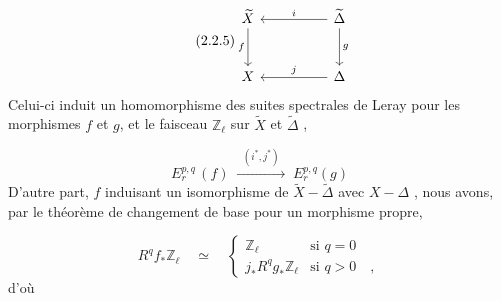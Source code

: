 \begin{equation}\tag{2.2.5}
\begin{tikzcd}[column sep=huge, row sep=large]
\widetilde{X} \arrow[d, "f"'] & \widetilde{\Delta} \arrow[l, "i"'] \arrow[d, "g"] \\
X & \Delta \arrow[l, "j"']
\end{tikzcd}
\end{equation}
Celui-ci induit un homomorphisme des suites spectrales de Leray pour les morphismes $f$ et $g$, et le faisceau $\mathbb{Z}_\ell$ sur $\widetilde{X}$ et $\widetilde{\Delta}$ ,

\begin{equation}\tag{2.2.6}
E_r^{p,q} \, (f) \;\xrightarrow{\;\;(i^*,j^*)\;\;}\; E_r^{p,q}(g)
\end{equation}
D'autre part, $f$ induisant un isomorphisme de $\widetilde{X} - \widetilde{\Delta}$ avec $X - \Delta$ , nous avons, par le théorème de changement de base pour un morphisme propre, 



\begin{equation}\tag{2.2.7}
 R^q f_* \mathbb{Z}_\ell \quad \simeq \quad \begin{cases} \mathbb{Z}_\ell & \text{si } q = 0 \\[2ex] j_* R^q g_* \mathbb{Z}_\ell & \text{si } q > 0 \quad , \end{cases}
\end{equation}
d'où

